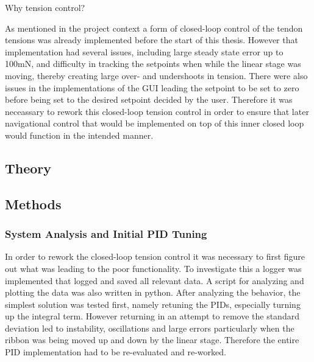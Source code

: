 

Why tension control?

As mentioned in the project context a form of closed-loop control of the tendon tensions was already implemented before the start of this thesis. However that implementation had several issues, including large steady state error up to 100mN, and difficulty in tracking the setpoints when while the linear stage was moving, thereby creating large over- and undershoots in tension. There were also issues in the implementations of the GUI leading the setpoint to be set to zero before being set to the desired setpoint decided by the user. Therefore it was neceassary to rework this closed-loop tension control in order to ensure that later navigational control that would be implemented on top of this inner closed loop would function in the intended manner.  


\subsection{Theory}

\subsection{Methods}

\subsubsection{System Analysis and Initial PID Tuning}
In order to rework the closed-loop tension control it was necessary to first figure out what was leading to the poor functionality. To investigate this a logger was implemented that logged and saved all relevant data. A script for analyzing and plotting the data was also written in python. 
\newline \newline
After analyzing the behavior, the simplest solution was tested first, namely retuning the PIDs, especially turning up the integral term. However returning in an attempt to remove the standard deviation led to instability, oscillations and large errors particularly when the ribbon was being moved up and down by the linear stage. Therefore the entire PID implementation had to be re-evaluated and re-worked. 

